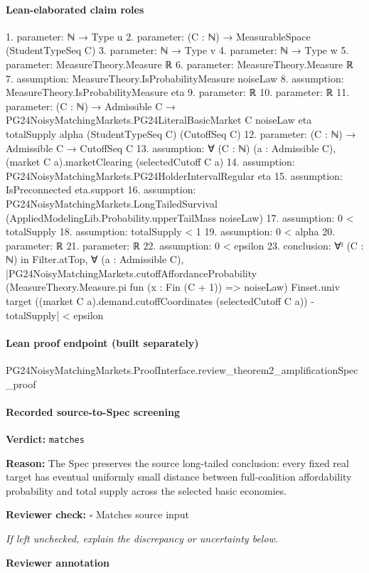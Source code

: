 \documentclass[10pt]{article}
\newcommand{\reviewerbox}{%
  \par\noindent\fbox{\parbox{0.96\linewidth}{\rule{0pt}{0.38in}}}\par
}
\newcommand{\reviewmatch}[1]{%
  \par\noindent\textbf{Reviewer check:} $\square$\; #1\par
  \noindent\emph{If left unchecked, explain the discrepancy or uncertainty below.}\par
}
\begin{document}
\paragraph{Lean-elaborated claim roles}\begin{ReviewVerbatim}
1. parameter: ℕ → Type u
2. parameter: (C : ℕ) → MeasurableSpace (StudentTypeSeq C)
3. parameter: ℕ → Type v
4. parameter: ℕ → Type w
5. parameter: MeasureTheory.Measure ℝ
6. parameter: MeasureTheory.Measure ℝ
7. assumption: MeasureTheory.IsProbabilityMeasure noiseLaw
8. assumption: MeasureTheory.IsProbabilityMeasure eta
9. parameter: ℝ
10. parameter: ℝ
11. parameter: (C : ℕ) →
  Admissible C →
    PG24NoisyMatchingMarkets.PG24LiteralBasicMarket C noiseLaw eta totalSupply alpha (StudentTypeSeq C) (CutoffSeq C)
12. parameter: (C : ℕ) → Admissible C → CutoffSeq C
13. assumption: ∀ (C : ℕ) (a : Admissible C), (market C a).marketClearing (selectedCutoff C a)
14. assumption: PG24NoisyMatchingMarkets.PG24HolderIntervalRegular eta
15. assumption: IsPreconnected eta.support
16. assumption: PG24NoisyMatchingMarkets.LongTailedSurvival (AppliedModelingLib.Probability.upperTailMass noiseLaw)
17. assumption: 0 < totalSupply
18. assumption: totalSupply < 1
19. assumption: 0 < alpha
20. parameter: ℝ
21. parameter: ℝ
22. assumption: 0 < epsilon
23. conclusion: ∀ᶠ (C : ℕ) in Filter.atTop,
  ∀ (a : Admissible C),
    |PG24NoisyMatchingMarkets.cutoffAffordanceProbability (MeasureTheory.Measure.pi fun (x : Fin (C + 1)) => noiseLaw)
            Finset.univ target ((market C a).demand.cutoffCoordinates (selectedCutoff C a)) -
          totalSupply| <
      epsilon
\end{ReviewVerbatim}

\paragraph{Lean proof endpoint (built separately)}\begin{ReviewVerbatim}
PG24NoisyMatchingMarkets.ProofInterface.review_theorem2_amplificationSpec_proof
\end{ReviewVerbatim}

\paragraph{Recorded source-to-Spec screening}
\textbf{Verdict:} \texttt{matches}
\\
{\raggedright
\textbf{Reason:} The Spec preserves the source long-\allowbreak{}tailed conclusion:\allowbreak{} every fixed real target has eventual uniformly small distance between full-\allowbreak{}coalition affordability probability and total supply across the selected basic economies.\allowbreak{}
\par}
\reviewmatch{Matches source input}
\noindent\textbf{Reviewer annotation}\par
\reviewerbox
\clearpage
\hypertarget{source-claim-62c35df4a96426fc}{}
\end{document}

